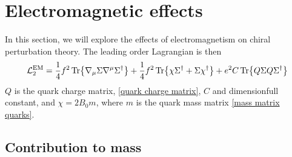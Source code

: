 \section{Electromagnetic effects}

In this section, we will explore the effects of electromagnetism on chiral perturbation theory.
The leading order Lagrangian is then~\autocite{eckerRoleResonancesChiral1989,urechVirtualPhotonsChiral1995}
%
\begin{equation}
    \label{leading order lagrangian EM}
    \mathcal{L}_2^{\text{EM}}
    = 
    \frac{1}{4}f^2 
    \Tr{
        \nabla_\mu \Sigma \nabla^\mu \Sigma^\dagger
    }
    +
    \frac{1}{4}f^2 
    \Tr{
        \chi \Sigma^\dagger + \Sigma\chi^\dagger
    }
    +
    e^2 C
    \Tr{Q \Sigma Q \Sigma^\dagger}
\end{equation}
%
$Q$ is the quark charge matrix, \autoref{quark charge matrix}, $C$ and dimensionfull constant, and $\chi = 2B_0 m$, where $m$ is the quark mass matrix \autoref{mass matrix quarks}.



\subsection{Contribution to mass}


